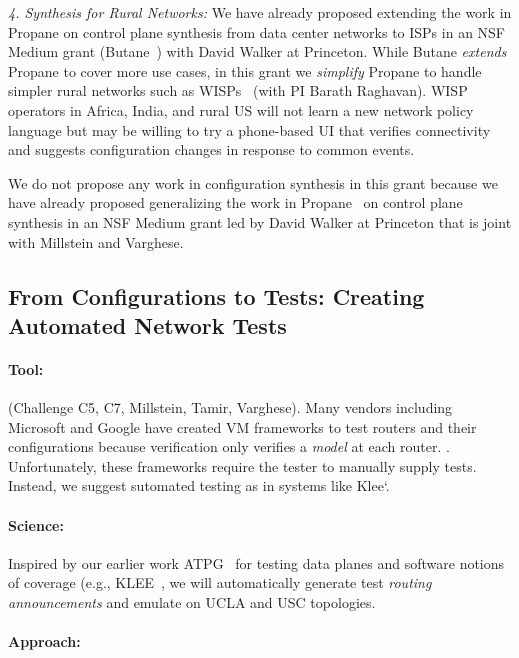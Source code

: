 {\em 4. Synthesis for Rural Networks:}  We have already proposed extending the work in Propane on control plane synthesis from data center networks to ISPs in an NSF Medium grant (Butane~\cite{butane}) with David Walker at Princeton.  While Butane {\em extends} Propane to cover more use cases, in this grant we {\em simplify} Propane to handle simpler rural networks such as WISPs~\cite{barathwisp} (with PI Barath Raghavan). WISP operators in Africa, India, and rural US will not learn a new network policy language but may be willing to try a phone-based UI that verifies connectivity and suggests configuration changes in response to common events.

We do not propose any work in configuration synthesis in this grant because we have already proposed generalizing the work in Propane~\cite{propane} on control plane synthesis in an NSF Medium grant led by David Walker at Princeton that is joint with Millstein and Varghese. 

\subsection{From Configurations to Tests: Creating Automated Network Tests}

\paragraph*{Tool:} (Challenge C5, C7, Millstein, Tamir, Varghese). Many vendors including Microsoft and 
Google have created VM frameworks to test routers and their configurations because verification only verifies a {\em  model} at  each router. .  Unfortunately, these frameworks require
the tester to manually supply tests.  Instead, we suggest sutomated testing as in systems like Klee`\cite{klee}.

\paragraph*{Science:}  Inspired  by our earlier work ATPG~\cite{atpg} for testing data planes and software notions of coverage (e.g., KLEE~\cite{klee}, we will automatically generate test {\em routing announcements} and emulate on UCLA and USC topologies.

\paragraph*{Approach:}

